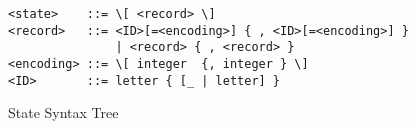 
\begin{figure}
\begin{verbatim} 
<state>    ::= \[ <record> \]
<record>   ::= <ID>[=<encoding>] { , <ID>[=<encoding>] } 
               | <record> { , <record> }
<encoding> ::= \[ integer  {, integer } \] 
<ID>       ::= letter { [_ | letter] }
\end{verbatim}
\caption{State Syntax Tree}
\label{fig:Sst}
\end{figure}

